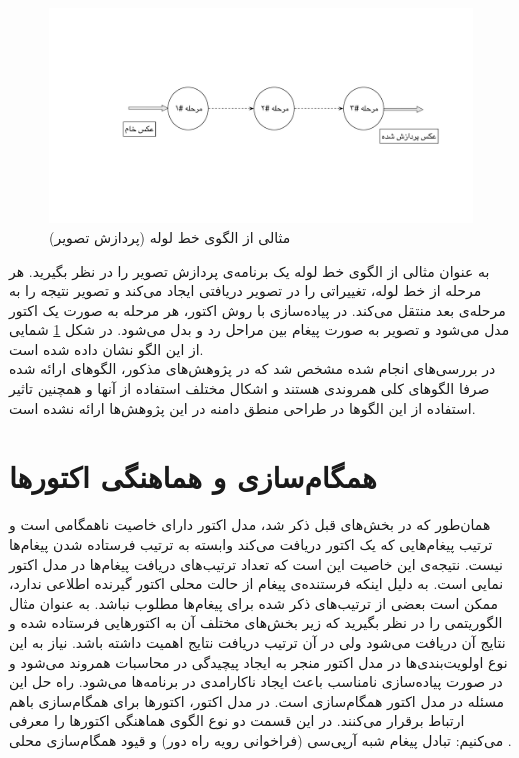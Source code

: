 \begin{figure}
    \begin{center}
	\includegraphics[width=16cm]{3-RelatedWork/Figures/pipeline.pdf}
    \end{center}
    \caption{\label{fig:pipeline}  مثالی از الگوی خط لوله (پردازش تصویر) }
\end{figure}
به عنوان مثالی از الگوی خط لوله یک برنامه‌ی پردازش تصویر را در نظر بگیرید. هر مرحله از خط لوله، تغییراتی را در تصویر دریافتی ایجاد می‌کند و تصویر نتیجه را به مرحله‌ی بعد منتقل می‌کند. در پیاده‌سازی با روش اکتور، هر مرحله به صورت یک اکتور مدل می‌شود و تصویر به صورت پیغام بین مراحل رد و بدل می‌شود. در شکل \ref{fig:pipeline} شمایی از این الگو نشان داده شده‌ است. \\
در بررسی‌های انجام شده مشخص شد که در پژوهش‌های مذکور، الگوهای ارائه شده صرفا الگوهای کلی همروندی هستند و اشکال مختلف استفاده از آنها و همچنین تاثیر استفاده از این الگوها در طراحی منطق دامنه در این پژوهش‌ها ارائه نشده است.

\section{ همگام‌سازی و هماهنگی اکتورها }
\label{section:coordinationAndSyncronization}
همان‌طور که در بخش‌های قبل ذکر شد،  مدل اکتور دارای خاصیت ناهمگامی‌ است و ترتیب پیغام‌هایی که یک اکتور دریافت می‌کند وابسته به ترتیب فرستاده شدن پیغام‌ها نیست. نتیجه‌ی این خاصیت این است که تعداد ترتیب‌های دریافت پیغام‌ها در مدل اکتور نمایی است\cite{KarmaniAgha_Actors_11}. به دلیل اینکه فرستنده‌ی پیغام از حالت محلی اکتور گیرنده اطلاعی ندارد، ممکن است بعضی از ترتیب‌های ذکر شده برای پیغام‌ها مطلوب نباشد. به عنوان مثال الگوریتمی را در نظر بگیرید که زیر بخش‌های مختلف آن به اکتور‌هایی فرستاده شده و نتایج آن دریافت می‌شود ولی در آن ترتیب دریافت نتایج اهمیت داشته باشد.  نیاز به این نوع اولویت‌بندی‌ها در مدل اکتور منجر به ایجاد پیچیدگی در محاسبات همروند می‌شود و در صورت پیاده‌سازی نامناسب باعث ایجاد ناکارامدی در برنامه‌ها می‌شود. راه حل این مسئله در مدل اکتور همگام‌سازی است. در مدل اکتور، اکتور‌ها برای همگام‌سازی باهم ارتباط برقرار می‌کنند. در این قسمت دو نوع الگوی هماهنگی اکتور‌ها را معرفی می‌کنیم: تبادل پیغام شبه آرپی‌سی (فراخوانی رویه راه دور) و قیود همگام‌سازی محلی . \cite{Agha1990,Agha93abstractionand,Papaioannou,KarmaniAgha_Actors_11} 
